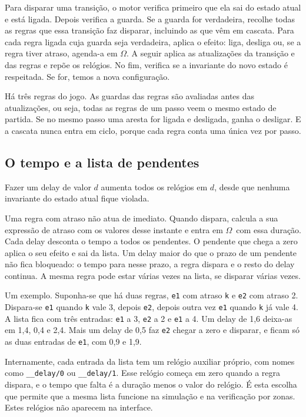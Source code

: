 \documentclass[11pt,a4paper]{article}
\newcommand{\code}[1]{\texttt{#1}}
\newcommand{\Om}{$\Omega$}
\begin{document}
Para disparar uma transição, o motor verifica primeiro que ela sai do estado atual e está ligada. Depois verifica a guarda. Se a guarda for verdadeira, recolhe todas as regras que essa transição faz disparar, incluindo as que vêm em cascata. Para cada regra ligada cuja guarda seja verdadeira, aplica o efeito: liga, desliga ou, se a regra tiver atraso, agenda-a em \Om. A seguir aplica as atualizações da transição e das regras e repõe os relógios. No fim, verifica se a invariante do novo estado é respeitada. Se for, temos a nova configuração.

Há três regras do jogo. As guardas das regras são avaliadas antes das atualizações, ou seja, todas as regras de um passo veem o mesmo estado de partida. Se no mesmo passo uma aresta for ligada e desligada, ganha o desligar. E a cascata nunca entra em ciclo, porque cada regra conta uma única vez por passo.

\subsection{O tempo e a lista de pendentes}

Fazer um delay de valor \(d\) aumenta todos os relógios em \(d\), desde que nenhuma invariante do estado atual fique violada.

Uma regra com atraso não atua de imediato. Quando dispara, calcula a sua expressão de atraso com os valores desse instante e entra em \Om\ com essa duração. Cada delay desconta o tempo a todos os pendentes. O pendente que chega a zero aplica o seu efeito e sai da lista. Um delay maior do que o prazo de um pendente não fica bloqueado: o tempo para nesse prazo, a regra dispara e o resto do delay continua. A mesma regra pode estar várias vezes na lista, se disparar várias vezes.

Um exemplo. Suponha-se que há duas regras, \code{e1} com atraso \code{k} e \code{e2} com atraso 2. Dispara-se \code{e1} quando \code{k} vale 3, depois \code{e2}, depois outra vez \code{e1} quando \code{k} já vale 4. A lista fica com três entradas: \code{e1} a 3, \code{e2} a 2 e \code{e1} a 4. Um delay de 1,6 deixa-as em 1,4, 0,4 e 2,4. Mais um delay de 0,5 faz \code{e2} chegar a zero e disparar, e ficam só as duas entradas de \code{e1}, com 0,9 e 1,9.

Internamente, cada entrada da lista tem um relógio auxiliar próprio, com nomes como \code{\_\_delay/0} ou \code{\_\_delay/1}. Esse relógio começa em zero quando a regra dispara, e o tempo que falta é a duração menos o valor do relógio. É esta escolha que permite que a mesma lista funcione na simulação e na verificação por zonas. Estes relógios não aparecem na interface.
\end{document}
